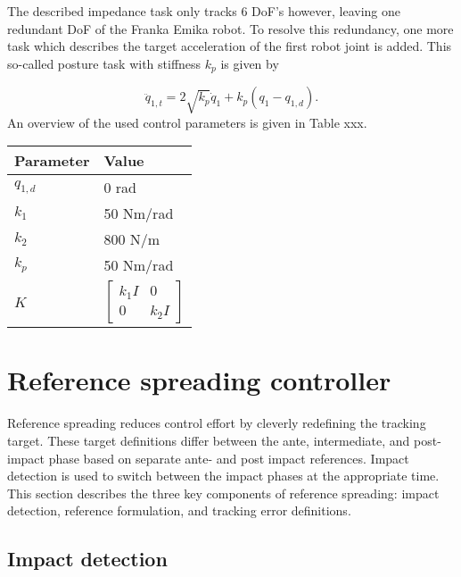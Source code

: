 \documentclass[a4paper, 10pt, conference]{ieeeconf}
\begin{document}
    The described impedance task only tracks 6 DoF's however, leaving one redundant DoF of the Franka Emika robot. To resolve this redundancy, one more task which describes the target acceleration of the first robot joint is added. This so-called posture task with stiffness $k_p$ is given by
    
    \begin{equation}
    \ddot{q}_{1,t} = 2\sqrt{k_p}\dot{q}_1+k_p(q_1-q_{1,d}).
    \end{equation}
    An overview of the used control parameters is given in Table xxx.
   
    \begin{table}[h]
    \centering
    \begin{tabular}{l|l}
    \hline
    Parameter & Value                                                \\ \hline
    $q_{1,d}$     & 0 rad                                              \\
    $k_1$     & 50 Nm/rad                                            \\
    $k_2$     & 800 N/m                                              \\
    $k_p$     & 50 Nm/rad                                            \\
    $K$       & $\begin{bmatrix} k_1 I &0 \\ 0 & k_2 I\end{bmatrix}$
    \end{tabular}
    \end{table}


    \section{Reference spreading controller}
    Reference spreading reduces control effort by cleverly redefining the tracking target. These target definitions differ between the ante, intermediate, and post-impact phase based on separate ante- and post impact references. Impact detection is used to switch between the impact phases at the appropriate time. This section describes the three key components of reference spreading: impact detection, reference formulation, and tracking error definitions.

    \subsection{Impact detection}
\end{document}
